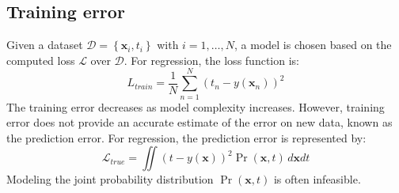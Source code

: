 \subsection{Training error}
Given a dataset $\mathcal{D}=\left\{ \mathbf{x}_i,t_i \right\}$ with $i=1,\ldots, N$, a model is chosen based on the computed loss $\mathcal{L}$ over $\mathcal{D}$. 
For regression, the loss function is:
\[L_{train}=\dfrac{1}{N}\sum_{n=1}^N{\left(t_n-y(\mathbf{x}_n)\right)}^2\]
The training error decreases as model complexity increases.
However, training error does not provide an accurate estimate of the error on new data, known as the prediction error. 
For regression, the prediction error is represented by:
\[\mathcal{L}_{true}=\iint{\left( t-y(\mathbf{x})\right)}^2\Pr(\mathbf{x},t)\,d\mathbf{x}dt \]
Modeling the joint probability distribution $\Pr(\textbf{x}, t)$ is often infeasible.

